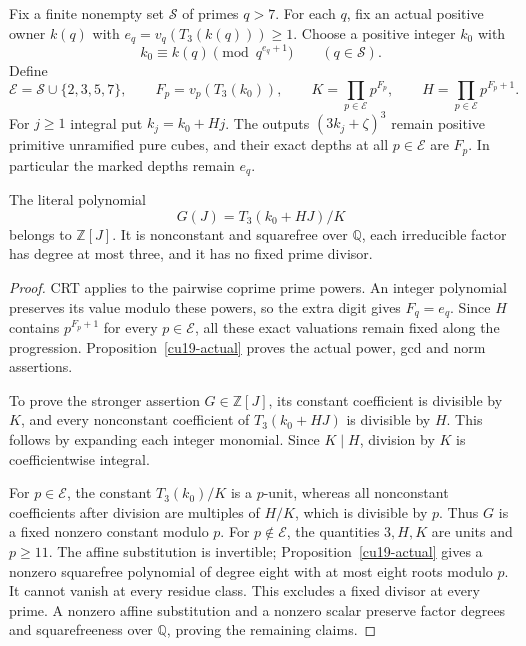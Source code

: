 \begin{theorem}
\label{cu19-packet}
Fix a finite nonempty set \(\mathcal S\) of primes \(q>7\). For each
\(q\), fix an actual positive owner \(k(q)\) with
\(e_q=v_q(T_3(k(q)))\ge1\). Choose a positive integer \(k_0\) with
\[
 k_0\equiv k(q)\pmod{q^{e_q+1}}\qquad(q\in\mathcal S).
\]
Define
\[
 \mathcal E=\mathcal S\cup\{2,3,5,7\},\qquad
 F_p=v_p(T_3(k_0)),\qquad
 K=\prod_{p\in\mathcal E}p^{F_p},\qquad
 H=\prod_{p\in\mathcal E}p^{F_p+1}.
\]
For \(j\ge1\) integral put \(k_j=k_0+Hj\). The outputs
\((3k_j+\zeta)^3\) remain positive primitive unramified pure cubes,
and their exact depths at all \(p\in\mathcal E\) are \(F_p\).
In particular the marked depths remain \(e_q\).

The literal polynomial
\begin{equation}
 G(J)=T_3(k_0+HJ)/K
 \label{cu19-quotient}
\end{equation}
belongs to \(\mathbb Z[J]\). It is nonconstant and squarefree over
\(\mathbb Q\), each irreducible factor has degree at most three,
and it has no fixed prime divisor.
\end{theorem}
\begin{proof}
CRT applies to the pairwise coprime prime powers. An integer
polynomial preserves its value modulo these powers, so the extra
digit gives \(F_q=e_q\). Since \(H\) contains \(p^{F_p+1}\) for
every \(p\in\mathcal E\), all these exact valuations remain fixed
along the progression. Proposition~\ref{cu19-actual} proves the
actual power, gcd and norm assertions.

To prove the stronger assertion \(G\in\mathbb Z[J]\), its constant
coefficient is divisible by \(K\), and every nonconstant coefficient
of \(T_3(k_0+HJ)\) is divisible by \(H\). This follows by expanding
each integer monomial. Since \(K\mid H\), division by \(K\) is
coefficientwise integral.

For \(p\in\mathcal E\), the constant \(T_3(k_0)/K\) is a \(p\)-unit,
whereas all nonconstant coefficients after division are multiples
of \(H/K\), which is divisible by \(p\). Thus \(G\) is a fixed
nonzero constant modulo \(p\). For \(p\notin\mathcal E\), the
quantities \(3,H,K\) are units and \(p\ge11\). The affine substitution
is invertible; Proposition~\ref{cu19-actual} gives a nonzero
squarefree polynomial of degree eight with at most eight roots
modulo \(p\). It cannot vanish at every residue class. This excludes
a fixed divisor at every prime. A nonzero affine substitution and
a nonzero scalar preserve factor degrees and squarefreeness over
\(\mathbb Q\), proving the remaining claims.
\end{proof}


